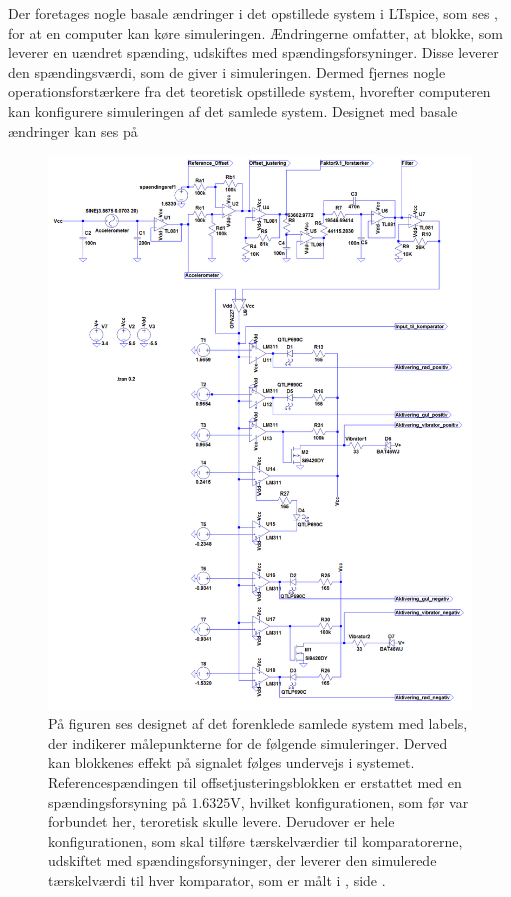Der foretages nogle basale ændringer i det opstillede system i LTspice, som ses , for at en computer kan køre simuleringen. Ændringerne omfatter, at blokke, som leverer en uændret spænding, udskiftes med spændingsforsyninger. Disse leverer den spændingsværdi, som de giver i simuleringen. Dermed fjernes nogle operationsforstærkere fra det teoretisk opstillede system, hvorefter computeren kan konfigurere simuleringen af det samlede system. Designet med basale ændringer kan ses på 
\begin{figure}[H]
	\centering
	\includegraphics[scale=.42]{figures/cProblemloesning/Samlet_system3_sim.PNG}
	\caption{På figuren ses designet af det forenklede samlede system med labels, der indikerer målepunkterne for de følgende simuleringer. Derved kan blokkenes effekt på signalet følges undervejs i systemet. Referencespændingen til offsetjusteringsblokken er erstattet med en spændingsforsyning på $1.6325$V, hvilket konfigurationen, som før var forbundet her, teroretisk skulle levere. Derudover er hele konfigurationen, som skal tilføre tærskelværdier til komparatorerne, udskiftet med spændingsforsyninger, der leverer den simulerede tærskelværdi til hver komparator, som er målt i , side \pageref{Tab:test_reference1}.}
	\label{fig:samlet_system}
\end{figure}
